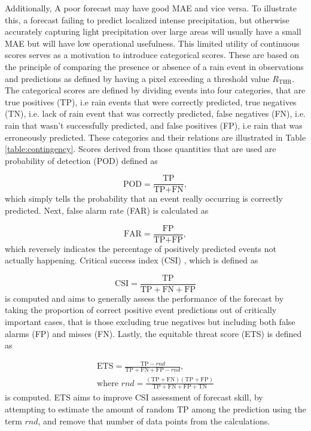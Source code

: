 Additionally, A poor forecast may have good MAE and vice versa. To illustrate this, a forecast failing to predict localized intense precipitation, but otherwise accurately capturing light precipitation over large areas will usually have a small MAE but will have low operational usefulness.
This limited utility of continuous scores serves as a motivation to introduce categorical scores. These are based on the principle of comparing the presence or absence of a rain event in observations and predictions as defined by having a pixel exceeding a threshold value $R_{\text{THR}}$. The categorical scores are defined by dividing events into four categories, that are true positives (TP), i.e rain events that were correctly predicted, true negatives (TN), i.e. lack of rain event that was correctly predicted, false negatives (FN), i.e. rain that wasn't successfully predicted, and false positives (FP), i.e rain that was erroneously predicted. These categories and their relations are illustrated in Table \ref{table:contingency}. Scores derived from those quantities that are used are probability of detection (POD) \cite{schaefer_critical_1990} defined as

\begin{equation}
	\text{POD} = \frac{\text{TP}}{\text{TP}+\text{FN}},
\end{equation} 
%
which simply tells the probability that an event really occurring is correctly predicted. Next, false alarm rate (FAR) \cite{schaefer_critical_1990} is calculated as 

\begin{equation}
	\text{FAR} = \frac{\text{FP}}{\text{TP}+\text{FP}},
\end{equation}
%
which reversely indicates the percentage of positively predicted events not actually happening. Critical success index (CSI) \cite{schaefer_critical_1990}, which is defined as 

\begin{equation}
	\text{CSI} = \frac{\text{TP}}{\text{TP}+\text{FN}+\text{FP}}
\end{equation}
%
is computed and aims to generally assess the performance of the forecast by taking the proportion of correct positive event predictions out of critically important cases, that is those excluding true negatives but including both false alarms (FP) and misses (FN). Lastly, the equitable threat score (ETS) \cite{hogan_equitability_2010} is defined as  

\begin{equation}
\begin{split}
\text{ETS} = \frac{\text{TP} - rnd}{\text{TP}+\text{FN}+\text{FP} - rnd}, \\
\text{where } rnd = \frac{(\text{TP}+\text{FN})(\text{TP}+\text{FP})}{\text{TP}+\text{FN}+\text{FP}+\text{TN}}
\end{split}
\end{equation}
%
is computed. ETS aims to improve CSI assessment of forecast skill, by attempting to estimate the amount of random TP among the prediction using the term $rnd$, and remove that number of data points from the calculations.

